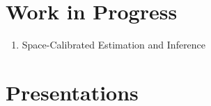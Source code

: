 \documentclass[12pt,letterpaper]{article}
\begin{document}
\section*{Work in Progress}
\begin{enumerate}

\item Space-Calibrated Estimation and Inference %

\end{enumerate}

\section*{Presentations}
\end{document}
